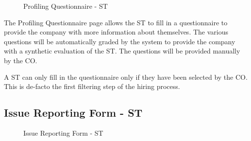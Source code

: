\begin{figure}[H]
    \centering
    \caption{Profiling Questionnaire - ST}
    \label{fig:profiling-questionnaire-st}
\end{figure}

\par The Profiling Questionnaire page allows the ST to fill in a questionnaire to provide the company with more
information about themselves. The various questions will be automatically graded by the system to provide the
company with a synthetic evaluation of the ST. The questions will be provided manually by the CO.

\par A ST can only fill in the questionnaire only if they have been selected by the CO. This is de-facto the first
filtering step of the hiring process.

\subsection{Issue Reporting Form - ST}
\label{subsec:issue-reporting-form-st}%

\begin{figure}[H]
    \centering
    \caption{Issue Reporting Form - ST}
    \label{fig:issue-reporting-form-st}
\end{figure}

